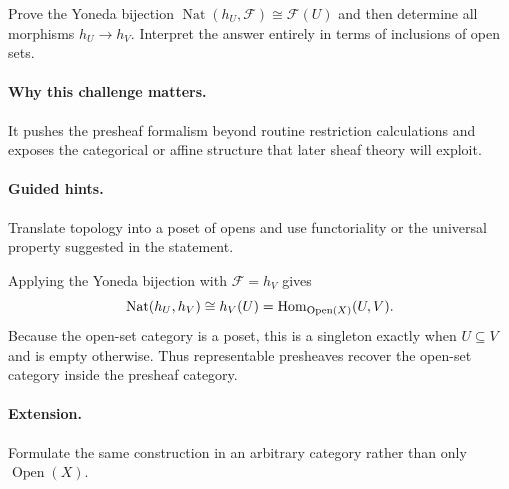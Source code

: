\begin{problem}
Prove the Yoneda bijection $\operatorname{Nat}(h_U,\mathcal F)\cong\mathcal F(U)$ and then determine all morphisms $h_U\to h_V$.  Interpret the answer entirely in terms of inclusions of open sets.
\end{problem}

\paragraph{Why this challenge matters.}
It pushes the presheaf formalism beyond routine restriction calculations and exposes the
categorical or affine structure that later sheaf theory will exploit.

\paragraph{Guided hints.}
Translate topology into a poset of opens and use functoriality or the universal property
suggested in the statement.

\begin{solution}
Applying the Yoneda bijection with $\mathcal F=h_V$ gives
\[
\operatorname{Nat}(h_U,h_V)\cong h_V(U)=\operatorname{Hom}_{\operatorname{Open}(X)}(U,V).
\]
Because the open-set category is a poset, this is a singleton exactly when $U\subseteq V$ and is empty otherwise.  Thus representable presheaves recover the open-set category inside the presheaf category.
\end{solution}

\paragraph{Extension.}
Formulate the same construction in an arbitrary category rather than only
$\operatorname{Open}(X)$.

